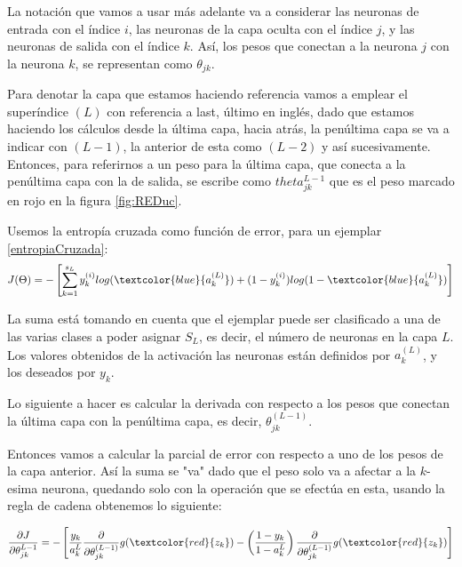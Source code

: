 La notación que vamos a usar más adelante va a considerar las neuronas de entrada con el índice $i$, las neuronas de la capa oculta con el índice $j$, y las neuronas de salida con el índice $k$. Así, los pesos que conectan a la neurona $j$ con la neurona $k$, se representan como $\theta_{jk}$. 


Para denotar la capa que estamos haciendo referencia vamos a emplear el superíndice $(L)$ con referencia a last, último en inglés, dado que estamos haciendo los cálculos desde la última capa, hacia atrás, la penúltima capa se va a indicar con $(L-1)$, la anterior de esta como $(L-2)$ y así sucesivamente. Entonces, para referirnos a un peso para la última capa, que conecta a la penúltima capa con la de salida, se escribe como $theta_{jk}^{L-1}$ que es el peso marcado en rojo en la figura \ref{fig:REDuc}.

Usemos la entropía cruzada como función de error, para un ejemplar \ref{entropiaCruzada}:
 \begin{equation}
  J (\Theta) = -\left[\sum_{k=1}^{s_{L}}y_{k}^{(i)} log(\textcolor{blue}{a_{k}^{(L)}}) + (1-y_{k}^{(i)}) log(1 - \textcolor{blue} {a_{k}^{(L)}})  \right] 
  \label{eq:EntropiaCruz}
 \end{equation}
 

 La suma está tomando en cuenta que el ejemplar puede ser clasificado a una de las varias clases a poder asignar $S_{L}$, es decir, el número de neuronas en la capa $L$. Los valores obtenidos de la activación las neuronas están definidos por $a_{k}^{(L)}$, y los deseados por $y_{k}$.
 
 Lo siguiente a hacer es calcular la derivada con respecto a los pesos que conectan la última capa con la penúltima capa, es decir, $\theta_{jk}^{(L-1)}$.
 
 Entonces vamos a calcular la parcial de error con respecto a uno de los pesos de la capa anterior. Así la suma se "va" dado que el peso solo va a afectar a la $k$-esima neurona, quedando solo con la operación que se efectúa en esta, usando la regla de cadena obtenemos lo siguiente:
 
 \begin{equation}
  \dfrac{\partial J}{\partial \theta_{jk}^{L-1}} = - \left[ \dfrac{y_{k}}{a_{k}^{L}} \dfrac{\partial}{\partial\theta_{jk}^{(L-1)}} g(\textcolor{red}{z_{k}}) - \left(\dfrac{1 - y_{k}}{1 - a_{k}^{L}} \right) \dfrac{\partial}{\partial \theta_{jk}^{(L-1)}}g(\textcolor{red}{z_{k}})\right]
 \end{equation}
 
